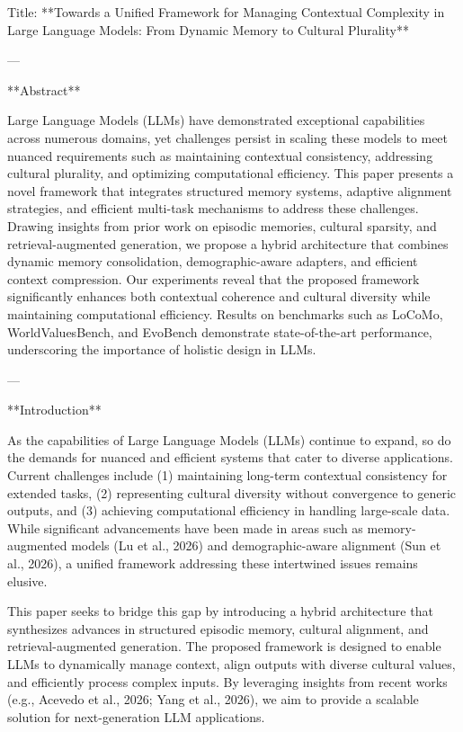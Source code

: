 Title: **Towards a Unified Framework for Managing Contextual Complexity in Large Language Models: From Dynamic Memory to Cultural Plurality**

---

**Abstract**

Large Language Models (LLMs) have demonstrated exceptional capabilities across numerous domains, yet challenges persist in scaling these models to meet nuanced requirements such as maintaining contextual consistency, addressing cultural plurality, and optimizing computational efficiency. This paper presents a novel framework that integrates structured memory systems, adaptive alignment strategies, and efficient multi-task mechanisms to address these challenges. Drawing insights from prior work on episodic memories, cultural sparsity, and retrieval-augmented generation, we propose a hybrid architecture that combines dynamic memory consolidation, demographic-aware adapters, and efficient context compression. Our experiments reveal that the proposed framework significantly enhances both contextual coherence and cultural diversity while maintaining computational efficiency. Results on benchmarks such as LoCoMo, WorldValuesBench, and EvoBench demonstrate state-of-the-art performance, underscoring the importance of holistic design in LLMs.

---

**Introduction**

As the capabilities of Large Language Models (LLMs) continue to expand, so do the demands for nuanced and efficient systems that cater to diverse applications. Current challenges include (1) maintaining long-term contextual consistency for extended tasks, (2) representing cultural diversity without convergence to generic outputs, and (3) achieving computational efficiency in handling large-scale data. While significant advancements have been made in areas such as memory-augmented models (Lu et al., 2026) and demographic-aware alignment (Sun et al., 2026), a unified framework addressing these intertwined issues remains elusive.

This paper seeks to bridge this gap by introducing a hybrid architecture that synthesizes advances in structured episodic memory, cultural alignment, and retrieval-augmented generation. The proposed framework is designed to enable LLMs to dynamically manage context, align outputs with diverse cultural values, and efficiently process complex inputs. By leveraging insights from recent works (e.g., Acevedo et al., 2026; Yang et al., 2026), we aim to provide a scalable solution for next-generation LLM applications.

